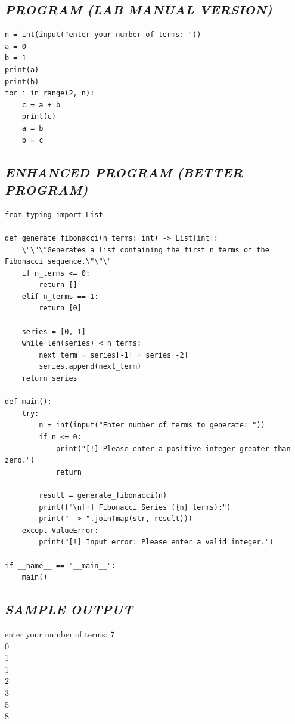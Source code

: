 \documentclass[11pt,a4paper]{article}
\begin{document}
\subsection*{\textit{PROGRAM (LAB MANUAL VERSION)}}
\begin{lstlisting}[style=pythonstyle]
n = int(input("enter your number of terms: ")) 
a = 0 
b = 1 
print(a) 
print(b) 
for i in range(2, n): 
    c = a + b 
    print(c)  
    a = b 
    b = c
\end{lstlisting}

\subsection*{\textit{ENHANCED PROGRAM (BETTER PROGRAM)}}
\begin{lstlisting}[style=pythonstyle]
from typing import List

def generate_fibonacci(n_terms: int) -> List[int]:
    \"\"\"Generates a list containing the first n terms of the Fibonacci sequence.\"\"\"
    if n_terms <= 0:
        return []
    elif n_terms == 1:
        return [0]
    
    series = [0, 1]
    while len(series) < n_terms:
        next_term = series[-1] + series[-2]
        series.append(next_term)
    return series

def main():
    try:
        n = int(input("Enter number of terms to generate: "))
        if n <= 0:
            print("[!] Please enter a positive integer greater than zero.")
            return
        
        result = generate_fibonacci(n)
        print(f"\n[+] Fibonacci Series ({n} terms):")
        print(" -> ".join(map(str, result)))
    except ValueError:
        print("[!] Input error: Please enter a valid integer.")

if __name__ == "__main__":
    main()
\end{lstlisting}

\subsection*{\textit{SAMPLE OUTPUT}}
\begin{tcolorbox}[colback=black!85,colframe=navyblue,title=\textbf{Terminal Output},coltitle=white,fonttitle=\bfseries\small]
\small\ttfamily\color{green!30!white}
enter your number of terms: 7\\
0\\
1\\
1\\
2\\
3\\
5\\
8
\end{tcolorbox}
\end{document}
